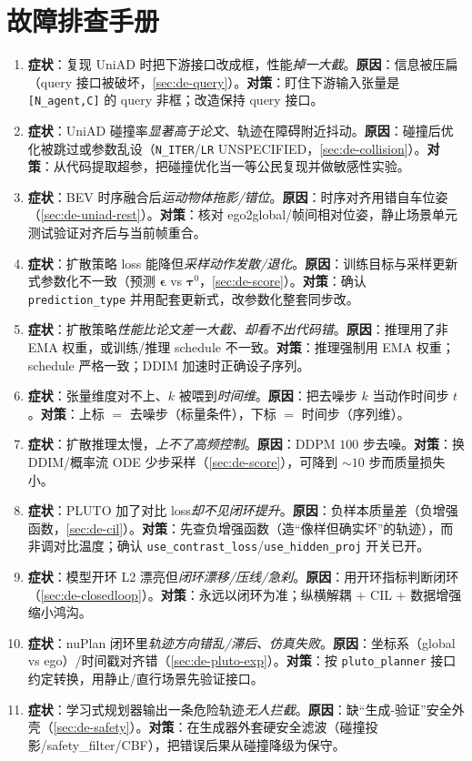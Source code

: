 \section*{故障排查手册}
\begin{enumerate}
  \item \textbf{症状}：复现 UniAD 时把下游接口改成框，性能\emph{掉一大截}。\textbf{原因}：信息被压扁（query 接口被破坏，\cref{sec:de-query}）。\textbf{对策}：盯住下游输入张量是 \texttt{[N\_agent,C]} 的 query 非框；改造保持 query 接口。
  \item \textbf{症状}：UniAD 碰撞率\emph{显著高于论文}、轨迹在障碍附近抖动。\textbf{原因}：碰撞后优化被跳过或参数乱设（\texttt{N\_ITER}/\texttt{LR} UNSPECIFIED，\cref{sec:de-collision}）。\textbf{对策}：从代码提取超参，把碰撞优化当一等公民复现并做敏感性实验。
  \item \textbf{症状}：BEV 时序融合后\emph{运动物体拖影/错位}。\textbf{原因}：时序对齐用错自车位姿（\cref{sec:de-uniad-rest}）。\textbf{对策}：核对 ego2global/帧间相对位姿，静止场景单元测试验证对齐后与当前帧重合。
  \item \textbf{症状}：扩散策略 loss 能降但\emph{采样动作发散/退化}。\textbf{原因}：训练目标与采样更新式参数化不一致（预测 $\boldsymbol{\epsilon}$ vs $\boldsymbol{\tau}^0$，\cref{sec:de-score}）。\textbf{对策}：确认 \texttt{prediction\_type} 并用配套更新式，改参数化整套同步改。
  \item \textbf{症状}：扩散策略\emph{性能比论文差一大截、却看不出代码错}。\textbf{原因}：推理用了非 EMA 权重，或训练/推理 schedule 不一致。\textbf{对策}：推理强制用 EMA 权重；schedule 严格一致；DDIM 加速时正确设子序列。
  \item \textbf{症状}：张量维度对不上、$k$ 被喂到\emph{时间维}。\textbf{原因}：把去噪步 $k$ 当动作时间步 $t$。\textbf{对策}：上标 $=$ 去噪步（标量条件），下标 $=$ 时间步（序列维）。
  \item \textbf{症状}：扩散推理太慢，\emph{上不了高频控制}。\textbf{原因}：DDPM $100$ 步去噪。\textbf{对策}：换 DDIM/概率流 ODE 少步采样（\cref{sec:de-score}），可降到 $\sim 10$ 步而质量损失小。
  \item \textbf{症状}：PLUTO 加了对比 loss\emph{却不见闭环提升}。\textbf{原因}：负样本质量差（负增强函数，\cref{sec:de-cil}）。\textbf{对策}：先查负增强函数（造“像样但确实坏”的轨迹），而非调对比温度；确认 \texttt{use\_contrast\_loss}/\texttt{use\_hidden\_proj} 开关已开。
  \item \textbf{症状}：模型开环 L2 漂亮但\emph{闭环漂移/压线/急刹}。\textbf{原因}：用开环指标判断闭环（\cref{sec:de-closedloop}）。\textbf{对策}：永远以闭环为准；纵横解耦 $+$ CIL $+$ 数据增强缩小鸿沟。
  \item \textbf{症状}：nuPlan 闭环里\emph{轨迹方向错乱/滞后、仿真失败}。\textbf{原因}：坐标系（global vs ego）/时间戳对齐错（\cref{sec:de-pluto-exp}）。\textbf{对策}：按 \texttt{pluto\_planner} 接口约定转换，用静止/直行场景先验证接口。
  \item \textbf{症状}：学习式规划器输出一条危险轨迹\emph{无人拦截}。\textbf{原因}：缺“生成-验证”安全外壳（\cref{sec:de-safety}）。\textbf{对策}：在生成器外套硬安全滤波（碰撞投影/safety\_filter/CBF），把错误后果从碰撞降级为保守。
\end{enumerate}
